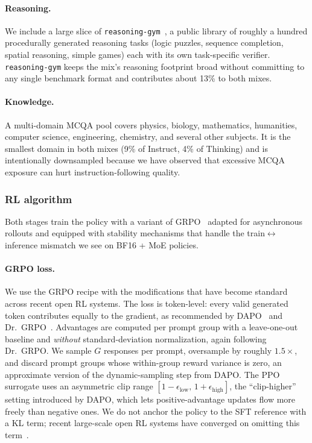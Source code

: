 \documentclass{llmxive}
\begin{document}
\paragraph{Reasoning.}
We include a large slice of \texttt{reasoning-gym}~\cite{stojanovski2025reasoninggym}, a public library of
roughly a hundred procedurally generated reasoning tasks (logic
puzzles, sequence completion, spatial reasoning, simple games) each
with its own task-specific verifier. \texttt{reasoning-gym} keeps the
mix's reasoning footprint broad without committing to any single
benchmark format and contributes about 13\% to both mixes.

\paragraph{Knowledge.}
A multi-domain MCQA pool covers physics, biology, mathematics,
humanities, computer science, engineering, chemistry, and several other
subjects. It is the smallest domain in both mixes (9\% of Instruct,
4\% of Thinking) and is intentionally downsampled because we have
observed that excessive MCQA exposure can hurt instruction-following
quality.

\subsubsection{RL algorithm}
\label{sec:rl-algorithm}

Both stages train the policy with a variant of
GRPO~\cite{shao2024deepseekmath} adapted for asynchronous rollouts and
equipped with stability mechanisms that handle the
train$\leftrightarrow$inference mismatch we see on BF16 + MoE policies.

\paragraph{GRPO loss.}
We use the GRPO recipe with the modifications that have become standard
across recent open RL systems. The loss is token-level: every valid
generated token contributes equally to the gradient, as recommended by
DAPO~\cite{yu2025dapo} and Dr.~GRPO~\cite{liu2025understanding}.
Advantages are computed per prompt group with a leave-one-out baseline
and \emph{without} standard-deviation normalization, again following
Dr.~GRPO. We sample $G$ responses per prompt, oversample by roughly
$1.5\times$, and discard prompt groups whose within-group reward
variance is zero, an approximate version of the dynamic-sampling step
from DAPO. The PPO surrogate uses an asymmetric clip range
$[1 - \epsilon_\text{low},\, 1 + \epsilon_\text{high}]$, the
``clip-higher'' setting introduced by DAPO, which lets positive-advantage
updates flow more freely than negative ones. We do not anchor the policy
to the SFT reference with a KL term; recent large-scale open RL systems
have converged on omitting this
term~\cite{olmo3,yang2025qwen3,nemotronnanov2,yu2025dapo}.
\end{document}
